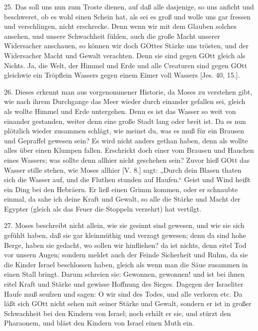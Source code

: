 25. Das soll uns nun zum Troste dienen, auf daß alle dasjenige, so uns anficht und beschweret, ob es wohl einen Schein hat, als sei es groß und wolle uns gar fressen und verschlingen, nicht erschrecke. Denn wenn wir mit dem Glauben solches ansehen, und unsere Schwachheit fühlen, auch die große Macht unserer Widersacher anschauen, so können wir doch GOttes Stärke uns trösten, und der Widersacher Macht und Gewalt verachten. Denn sie sind gegen GOtt gleich als Nichts. Ja, die Welt, der Himmel und Erde und alle Creaturen sind gegen GOtt gleichwie ein Tröpflein Wassers gegen einem Eimer voll Wassers [Jes. 40, 15.].

26. Dieses erkennt man aus vorgenommener Historie, da Moses zu verstehen gibt, wie nach ihrem Durchgange das Meer wieder durch einander gefallen sei, gleich als wollte Himmel und Erde untergehen. Denn es ist das Wasser so weit von einander gestanden, weiter denn eine große Stadt lang oder breit ist. Da es nun plötzlich wieder zusammen schlägt, wie meinst du, was es muß für ein Brausen und Gepraffel gewesen sein? Es wird nicht anders gethan haben, denn als wollte alles über einen Klumpen fallen. Erschrickt doch einer vom Brausen und Hauchen eines Wassers; was sollte denn allhier nicht geschehen sein? Zuvor hieß GOtt das Wasser stille stehen, wie Moses allhier [V. 8.] sagt: „Durch dein Blasen thaten sich die Wasser auf, und die Fluthen stunden auf Haufen.“ Geist und Wind heißt ein Ding bei den Hebräern. Er ließ einen Grimm kommen, oder er schnaubte einmal, da sahe ich deine Kraft und Gewalt, so alle die Stärke und Macht der Egypter (gleich als das Feuer die Stoppeln verzehrt) hat vertilgt.

27. Moses beschreibt nicht allein, wie sie gesinnt sind gewesen, und wie sie sich gefühlt haben, daß sie gar kleinmüthig und verzagt gewesen; denn da sind hohe Berge, haben sie gedacht, wo sollen wir hinfliehen? da ist nichts, denn eitel Tod vor unsern Augen; sondern meldet auch der Feinde Sicherheit und Ruhm, da sie die Kinder Israel beschlossen haben, gleich als wenn man die Säue zusammen in einen Stall bringt. Darum schreien sie: Gewonnen, gewonnen! und ist bei ihnen eitel Kraft und Stärke und gewisse Hoffnung des Sieges. Dagegen der Israeliter
Haufe muß seufzen und sagen: O wir sind des Todes, und alle verloren etc. Da läßt sich GOtt nicht sehen mit seiner Stärke und Gewalt, sondern er ist in großer Schwachheit bei den Kindern von Israel; noch erhält er sie, und stürzt den Pharaonem, und bläst den Kindern von Israel einen Muth ein.

